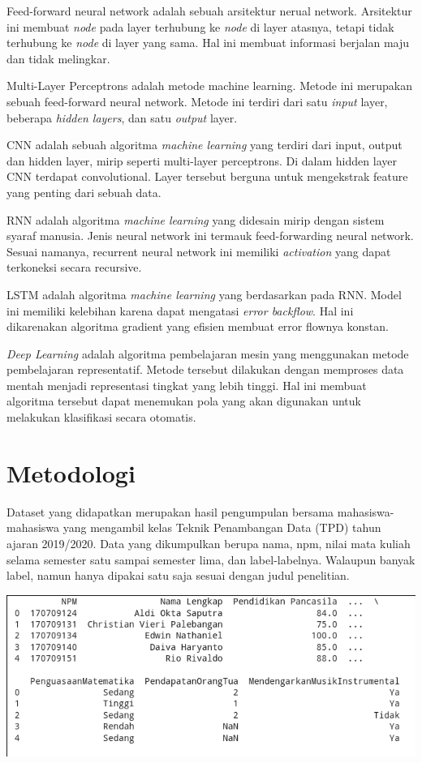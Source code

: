 \documentclass[12pt, a4paper]{article}
\begin{document}
\begin{multicols}{2}
Feed-forward neural network adalah sebuah arsitektur nerual network. Arsitektur ini membuat \textit{node} pada layer terhubung ke \textit{node} di layer atasnya, tetapi tidak terhubung ke \textit{node} di layer yang sama. Hal ini membuat informasi berjalan maju dan tidak melingkar. \cite{Schmidt.1992}

Multi-Layer Perceptrons adalah metode machine learning. Metode ini merupakan sebuah feed-forward neural network. Metode ini terdiri dari satu \textit{input} layer, beberapa \textit{hidden layers}, dan satu \textit{output} layer. \cite{Riedmiller.1994}

CNN adalah sebuah algoritma \textit{machine learning} yang terdiri dari input, output dan hidden layer, mirip seperti multi-layer perceptrons. Di dalam hidden layer CNN terdapat convolutional. Layer tersebut berguna untuk mengekstrak feature yang penting dari sebuah data. \cite{Valueva.2020}

RNN adalah algoritma \textit{machine learning} yang didesain mirip dengan sistem syaraf manusia. Jenis neural network ini termauk feed-forwarding neural network. Sesuai namanya, recurrent neural network ini memiliki \textit{activation} yang dapat terkoneksi secara recursive. \cite{Lukosevicius.2009}

LSTM adalah algoritma \textit{machine learning} yang berdasarkan pada RNN. Model ini memiliki kelebihan karena dapat mengatasi \textit{error backflow}. Hal ini dikarenakan algoritma gradient yang efisien membuat error flownya konstan. \cite{Hochreiter.1997}

\textit{Deep Learning} adalah algoritma pembelajaran mesin yang menggunakan metode pembelajaran representatif. Metode tersebut dilakukan dengan memproses data mentah menjadi representasi tingkat yang lebih tinggi. Hal ini membuat algoritma tersebut dapat menemukan pola yang akan digunakan untuk melakukan klasifikasi secara otomatis. \cite{LeCun.2015}

\section{Metodologi}
Dataset yang didapatkan merupakan hasil pengumpulan bersama mahasiswa-mahasiswa yang mengambil kelas Teknik Penambangan Data (TPD) tahun ajaran 2019/2020. Data yang dikumpulkan berupa nama, npm, nilai mata kuliah selama semester satu sampai semester lima, dan label-labelnya. Walaupun banyak label, namun hanya dipakai satu saja sesuai dengan judul penelitian.

\centering
\vspace{0.2cm}
\includegraphics[scale=0.28]{see_data}

\end{multicols}


\printbibliography[title = Daftar Pustaka]
\end{document}
